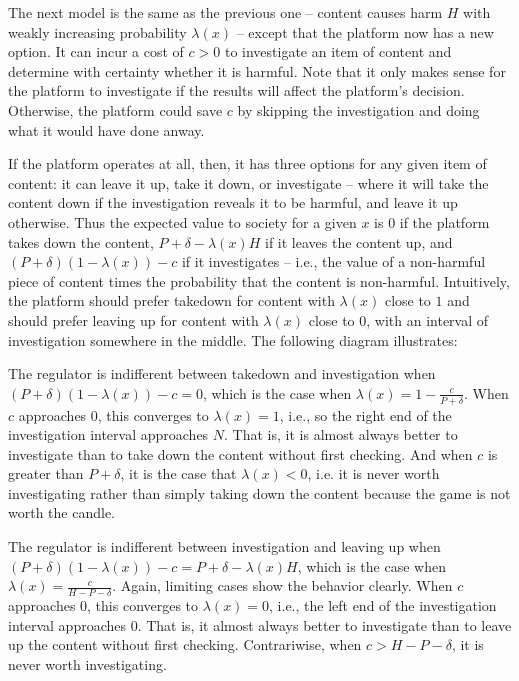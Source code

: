 The next model is the same as the previous one -- content causes harm $H$  with weakly increasing probability $\lambda(x)$ -- except that the platform now has a new option. It can incur a cost of $c > 0$ to investigate an item of content and determine with certainty whether it is harmful. Note that it only makes sense for the platform to investigate if the results will affect the platform's decision. Otherwise, the platform could save $c$ by skipping the investigation and doing what it would have done anway.

If the platform operates at all, then, it has three options for any given item of content: it can leave it up, take it down, or investigate -- where it will take the content down if the investigation reveals it to be harmful, and leave it up otherwise. Thus the expected value to society for a given $x$ is $0$ if the platform takes down the content, $P + \delta - \lambda(x)H$ if it leaves the content up, and $(P + \delta)(1 - \lambda(x)) - c$ if it investigates -- i.e., the value of a non-harmful piece of content times the probability that the content is non-harmful. Intuitively, the platform should prefer takedown for content with $\lambda(x)$ close to $1$ and should prefer leaving up for content with $\lambda(x)$ close to $0$, with an interval of investigation somewhere in the middle. The following diagram illustrates:


The regulator is indifferent between takedown and investigation when $(P + \delta)(1 - \lambda(x)) - c = 0$, which is the case when $\lambda(x) = 1 - \frac{c}{P + \delta}$. When $c$ approaches $0$, this converges to $\lambda(x) = 1$, i.e., so the right end of the investigation interval approaches $N$. That is, it is almost always better to investigate than to take down the content without first checking. And when $c$ is greater than $P+\delta$, it is the case that $\lambda(x) <0$, i.e. it is never worth investigating rather than simply taking down the content because the game is not worth the candle.

The regulator is indifferent between investigation and leaving up when $(P + \delta)(1 - \lambda(x)) - c = P + \delta - \lambda(x)H$, which is the case when $\lambda(x) = \frac{c}{H - P - \delta}$. Again, limiting cases show the behavior clearly. When $c$ approaches $0$, this converges to $\lambda(x) = 0$, i.e., the left end of the investigation interval approaches $0$. That is, it almost always better to investigate than to leave up the content without first checking. Contrariwise, when $c > H - P - \delta$, it is never worth investigating.

